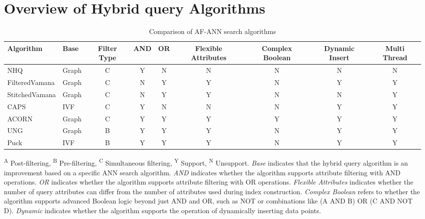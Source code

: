 \documentclass[sigconf, nonacm]{acmart}
\begin{document}
\begin{sloppypar}
\section{Overview of Hybrid query Algorithms}

\setlength{\textfloatsep}{0cm}
\setlength{\floatsep}{0cm}
\begin{table}[t]
	\centering
        \setlength{\abovecaptionskip}{0.05cm}
        
	\caption{Comparison of AF-ANN search algorithms}
	\small
	\label{tab:compair_1}
    \begin{tabular}{|l|l|c|c|c|c|c|c|c|}
		\hline
        \textbf{Algorithm} & \textbf{Base} & \textbf{Filter Type} & \textbf{AND} & \textbf{OR} & \textbf{Flexible Attributes} & \textbf{Complex Boolean} & \textbf{Dynamic Insert} & \textbf{Multi Thread} \\
		\hline
         NHQ & Graph & C & Y & N& N& N & N & N \\
         FilteredVamana & Graph & C & N & Y & Y & N & Y & Y \\
	StitchedVamana & Graph & C & N & Y & Y & N & N & Y  \\
        CAPS & IVF & C & Y & N & N & N & Y & Y \\
        ACORN & Graph & C & Y & Y & Y & Y & Y & Y \\
       UNG & Graph & B & Y & Y & Y & N & Y & Y \\ 
        Puck & IVF & B & Y & Y & Y & N & Y & Y \\
		
		\hline
	\end{tabular}

    \vspace{0.2em}
	\centering
    \footnotesize{
	\begin{minipage}{\linewidth}
		\textsuperscript{A} Post-filtering, 
		\textsuperscript{B} Pre-filtering, 
		\textsuperscript{C} Simultaneous filtering, 
		\textsuperscript{Y} Support, 
		\textsuperscript{N} Unsupport. 
		\textit{Base} indicates that the hybrid query algorithm is an improvement based on a specific ANN search algorithm. 
		\textit{AND} indicates whether the algorithm supports attribute filtering with AND operations. 
		\textit{OR} indicates whether the algorithm supports attribute filtering with OR operations. 
		\textit{Flexible Attributes} indicates whether the number of query attributes can differ from the number of attributes used during index construction. 
		\textit{Complex Boolean} refers to whether the algorithm supports advanced Boolean logic beyond just AND and OR, such as NOT or combinations like (A AND B) OR (C AND NOT D). 
		\textit{Dynamic} indicates whether the algorithm supports the operation of dynamically inserting data points.
	\end{minipage}}
    \vspace{-0.5cm}
\end{table}



\end{sloppypar}
\end{document}
